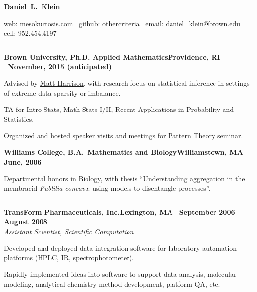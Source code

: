 \documentclass{article}
\newcommand{\ressection}[1]{\noindent{\large\textbf{#1}}\vspace{2pt}\hrule\vspace{4pt}}
\newcommand{\leftandright}[2]{\noindent\textbf{#1}\hfill\textbf{#2}}
\begin{document}
\sffamily

\begin{center}
\textbf{\huge{Daniel~L.~Klein}}

web: \href{http://mesokurtosis.com}{mesokurtosis.com}
\textbullet\, github: \href{https://gititbub.com/othercriteria}{othercriteria}
\textbullet\, email: \href{mailto:daniel_klein@brown.edu}{daniel\_klein@brown.edu}
\textbullet\, cell: 952.454.4197
\end{center}

\ressection{Education}

\leftandright{Brown University, \textmd{Ph.D. Applied
    Mathematics}}{Providence, RI \textbullet\ November, 2015 (anticipated)}
\begin{itemize*}
\item Advised by \href{http://www.dam.brown.edu/people/harrison}{Matt
    Harrison}, with research focus on statistical inference in
  settings of extreme data sparsity or imbalance.
\item TA for Intro Stats, Math Stats I/II, Recent Applications in
  Probability and Statistics.
\item Organized and hosted speaker visits and meetings for Pattern
  Theory seminar.
\end{itemize*}

\leftandright{Williams College, \textmd{B.A.\ Mathematics and
    Biology}}{Williamstown, MA \textbullet\, June, 2006}
\begin{itemize*}
\item Departmental honors in Biology, with thesis ``Understanding
  aggregation in the membracid \emph{Publilia concava}: using models
  to disentangle processes''.
\end{itemize*}

\vspace{1.0em}

\ressection{Work experience}

\leftandright{TransForm Pharmaceuticals, Inc.}{Lexington, MA
  \textbullet\, September 2006 -- August 2008} \\
\textit{Assistant Scientist, Scientific Computation}

\begin{itemize*}
\item Developed and deployed data integration software for laboratory
  automation platforms (HPLC, IR, spectrophotometer).
\item Rapidly implemented ideas into software to support data
  analysis, molecular modeling, analytical chemistry method
  development, platform QA, etc.
\end{itemize*}
\end{document}
